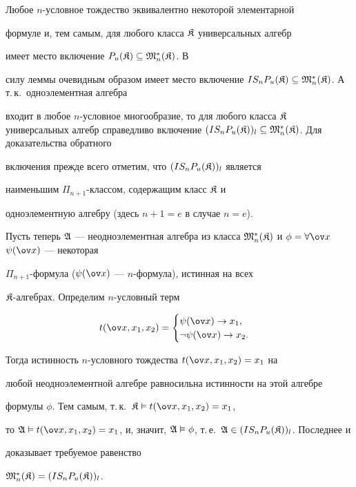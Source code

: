 \begin{pf} 


Любое $n$-условное тождество эквивалентно некоторой элементарной 


формуле и, тем самым, для любого класса $\frak K$ универсальных алгебр 


имеет место включение $P_u(\frak K)\subseteq\frak M^*_n(\frak K)$. В 


силу леммы очевидным образом имеет место включение $IS_n P_u(\frak 


K)\subseteq\frak M^*_n(\frak K)$. А т.\,к.~одноэлементная алгебра 


входит в любое $n$-условное многообразие, то для любого класса $\frak 


K$ универсальных алгебр справедливо включение $(IS_n P_u(\frak 


K))_l\subseteq\frak M^*_n(\frak K)$. Для доказательства обратного 


включения прежде всего отметим, что $(IS_n P_u(\frak K))_l$ является 


наименьшим $\Pi_{n+1}$-классом, содержащим класс $\frak K$ и 


одноэлементную алгебру (здесь $n+1=e$ в случае $n=e$). 


 


Пусть теперь $\frak A$ --- неодноэлементная алгебра из класса $\frak 


M^*_n(\frak K)$ и $\phi=\forall\ov x$\; $\psi(\ov x)$ --- некоторая 


$\Pi_{n+1}$-формула ($\psi(\ov x)$ --- $n$-формула), истинная на всех 


$\frak K$-алгебрах. Определим $n$-условный терм 


$$ 


t(\ov x,x_1,x_2)= 


\begin{cases} 


\psi(\ov x)\to x_1,\\ 


\neg\psi(\ov x)\to x_2. 


\end{cases} 


$$ 


Тогда истинность $n$-условного тождества $t(\ov x,x_1,x_2)=x_1$ на 


любой неодноэлементной алгебре равносильна истинности на этой алгебре 


формулы $\phi$. Тем самым, т.\,к.~$\frak K\vDash t(\ov x,x_1,x_2)=x_1$, 


то $\frak A\vDash t(\ov x,x_1,x_2)=x_1$, и, значит, $\frak 


A\vDash\phi$, т.\,е.~$\frak A\in(IS_n P_u(\frak K))_l$. Последнее и 


доказывает требуемое равенство 


$\frak M^*_n(\frak K)=(IS_n P_u(\frak K))_l$. 


\end{pf} 


